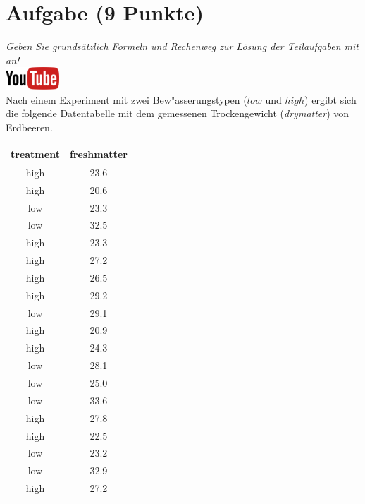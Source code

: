 \documentclass[a4paper, 10pt]{scrartcl}\usepackage[]{graphicx}\usepackage[]{xcolor}
\begin{document}
 
\clearpage

\section{Aufgabe \hfill (9 Punkte)}

\textit{Geben Sie grunds{\"a}tzlich Formeln und Rechenweg zur L{\"o}sung der
  Teilaufgaben mit an!} \\[1Ex]

\hfill\href{https://youtu.be/0xc0jIPeiyw}{\includegraphics[width =
  2cm]{img/youtube}}\\[1Ex]



Nach einem Experiment mit zwei Bew{"a}sserungstypen ($low$ und $high$) ergibt sich die
folgende Datentabelle mit dem gemessenen Trockengewicht
(\textit{drymatter})  von Erdbeeren. 

\begin{table}[!h]
\centering
\begin{tabular}{cc}
\toprule
treatment & freshmatter\\
\midrule
high & 23.6\\
high & 20.6\\
low & 23.3\\
low & 32.5\\
high & 23.3\\
\addlinespace
high & 27.2\\
high & 26.5\\
high & 29.2\\
low & 29.1\\
high & 20.9\\
\addlinespace
high & 24.3\\
low & 28.1\\
low & 25.0\\
low & 33.6\\
high & 27.8\\
\addlinespace
high & 22.5\\
low & 23.2\\
low & 32.9\\
high & 27.2\\
\bottomrule
\end{tabular}
\end{table}
\end{document}
